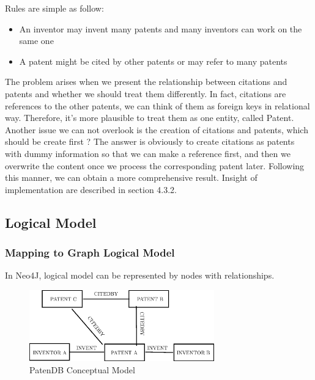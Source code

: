 \documentclass{sig-alternate}
\begin{document}
{Rules are simple as follow:

\begin{itemize}
  \item An inventor may invent many patents and many inventors can work on the same one
  \item A patent might be cited by other patents or may refer to many patents
\end{itemize}

The problem arises when we present the relationship between citations and patents and whether we should treat them differently. In fact, citations are references to the other patents, we can think of them as foreign keys in relational way. Therefore, it's more plausible to treat them as one entity, called Patent. Another issue we can not overlook is the creation of citations and patents, which should be create first ? The answer is obviously to create citations as patents with dummy information so that we can make a reference first, and then we overwrite the content once we process the corresponding patent later. Following this manner, we can obtain a more comprehensive result. Insight of implementation are described in section 4.3.2.

\subsection{Logical Model}
\subsubsection{Mapping to Graph Logical Model}
In Neo4J, logical model can be represented by nodes with relationships.

\begin{figure}[htb]
\centering
\includegraphics[width=80mm,scale=10]{neo4jgraph.eps}
\caption{ PatenDB Conceptual Model}
\end{figure}

}
\end{document}
